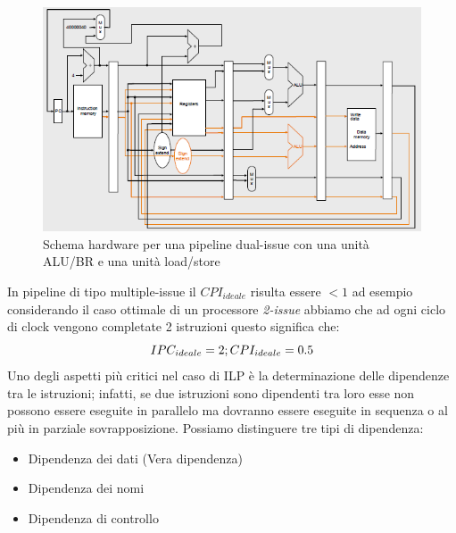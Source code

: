 \begin{figure}
\centering
\includegraphics[scale=0.5]{img/dualmips.png}
\caption{Schema hardware per una pipeline dual-issue con una unità ALU/BR e una unità load/store}\label{fig:dualmips}
\end{figure}
In pipeline di tipo multiple-issue il $CPI_{ideale}$ risulta essere $<1$ ad esempio considerando il caso ottimale di un processore \emph{2-issue} abbiamo che ad ogni ciclo di clock vengono completate 2 istruzioni questo significa che:
$$IPC_{ideale} = 2; \\ CPI_{ideale} = 0.5$$
Uno degli aspetti più critici nel caso di ILP è la determinazione delle dipendenze tra le istruzioni; infatti, se due istruzioni sono dipendenti tra loro esse non possono essere eseguite in parallelo ma dovranno essere eseguite in sequenza o al più in parziale sovrapposizione. Possiamo distinguere tre tipi di dipendenza:
\begin{itemize}
\item Dipendenza dei dati (Vera dipendenza)
\item Dipendenza dei nomi
\item Dipendenza di controllo
\end{itemize}
